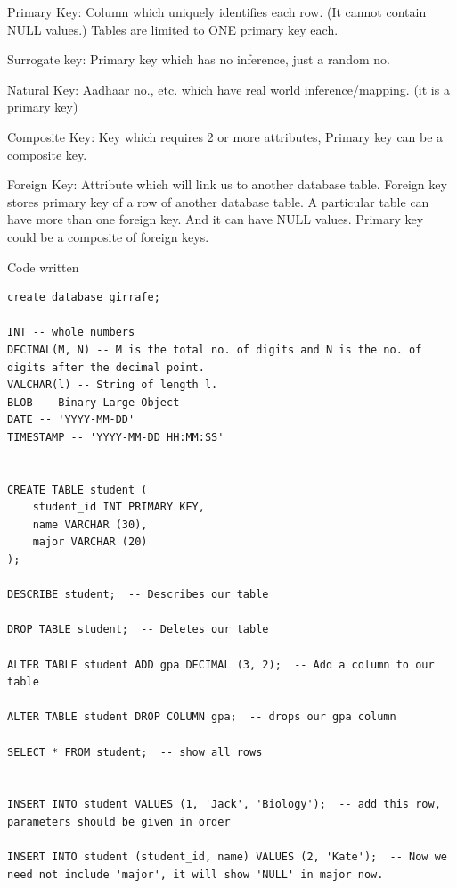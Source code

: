 \documentclass[8pt, a4paper, oneside, twocolumn]{extarticle}
\begin{document}
Primary Key: Column which uniquely identifies each row. (It cannot contain NULL values.) Tables are limited to ONE primary key each.

Surrogate key: Primary key which has no inference, just a random no.

Natural Key: Aadhaar no., etc. which have real world inference/mapping. (it is a primary key)

Composite Key: Key which requires 2 or more attributes, Primary key can be a composite key. 

Foreign Key: Attribute which will link us to another database table. Foreign key stores primary key of a row of another database table. A particular table can have more than one foreign key. And it can have NULL values. Primary key could be a composite of foreign keys.

Code written
\begin{verbatim}
create database girrafe;

INT -- whole numbers
DECIMAL(M, N) -- M is the total no. of digits and N is the no. of digits after the decimal point.
VALCHAR(l) -- String of length l.
BLOB -- Binary Large Object
DATE -- 'YYYY-MM-DD'
TIMESTAMP -- 'YYYY-MM-DD HH:MM:SS'


CREATE TABLE student (
    student_id INT PRIMARY KEY,
    name VARCHAR (30),
    major VARCHAR (20)
);

DESCRIBE student;  -- Describes our table

DROP TABLE student;  -- Deletes our table

ALTER TABLE student ADD gpa DECIMAL (3, 2);  -- Add a column to our table

ALTER TABLE student DROP COLUMN gpa;  -- drops our gpa column

SELECT * FROM student;  -- show all rows


INSERT INTO student VALUES (1, 'Jack', 'Biology');  -- add this row, parameters should be given in order

INSERT INTO student (student_id, name) VALUES (2, 'Kate');  -- Now we need not include 'major', it will show 'NULL' in major now.
\end{verbatim}
\end{document}
